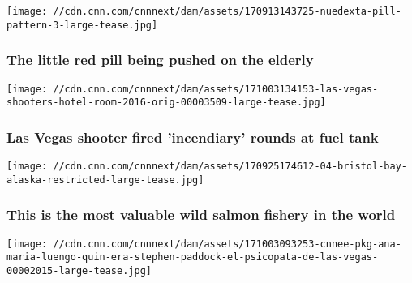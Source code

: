 \href{/2017/10/12/health/nuedexta-nursing-homes-invs/index.html}{}

\texttt{[image: //cdn.cnn.com/cnnnext/dam/assets/170913143725-nuedexta-pill-pattern-3-large-tease.jpg]}

\hypertarget{the-little-red-pill-being-pushed-on-the-elderly}{%
\subsubsection{\texorpdfstring{\href{/2017/10/12/health/nuedexta-nursing-homes-invs/index.html}{The
little red pill being pushed on the
elderly}}{The little red pill being pushed on the elderly}}\label{the-little-red-pill-being-pushed-on-the-elderly}}

\href{/2017/10/10/us/las-vegas-shooter-incendiary-rounds/index.html}{}

\texttt{[image: //cdn.cnn.com/cnnnext/dam/assets/171003134153-las-vegas-shooters-hotel-room-2016-orig-00003509-large-tease.jpg]}

\hypertarget{las-vegas-shooter-fired-incendiary-rounds-at-fuel-tank}{%
\subsubsection{\texorpdfstring{\href{/2017/10/10/us/las-vegas-shooter-incendiary-rounds/index.html}{Las
Vegas shooter fired 'incendiary' rounds at fuel
tank}}{Las Vegas shooter fired 'incendiary' rounds at fuel tank}}\label{las-vegas-shooter-fired-incendiary-rounds-at-fuel-tank}}

\href{/2017/10/10/politics/bristol-bay-salmon-invs/index.html}{}

\texttt{[image: //cdn.cnn.com/cnnnext/dam/assets/170925174612-04-bristol-bay-alaska-restricted-large-tease.jpg]}

\hypertarget{this-is-the-most-valuable-wild-salmon-fishery-in-the-world-1}{%
\subsubsection{\texorpdfstring{\href{/2017/10/10/politics/bristol-bay-salmon-invs/index.html}{This
is the most valuable wild salmon fishery in the
world}}{This is the most valuable wild salmon fishery in the world}}\label{this-is-the-most-valuable-wild-salmon-fishery-in-the-world-1}}

\href{/2017/10/09/us/las-vegas-stephen-paddock-deposition/index.html}{}

\texttt{[image: //cdn.cnn.com/cnnnext/dam/assets/171003093253-cnnee-pkg-ana-maria-luengo-quin-era-stephen-paddock-el-psicopata-de-las-vegas-00002015-large-tease.jpg]}

